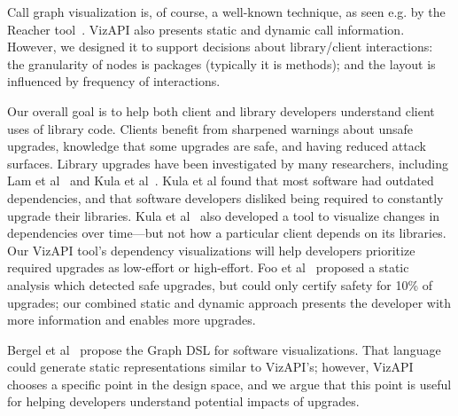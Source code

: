 Call graph visualization is, of course, a well-known technique, as seen e.g. by the Reacher tool~\cite{latoza11:_visual_call_graph}. 
VizAPI also presents static and dynamic call information. However, we designed
it to support decisions about library/client interactions: the granularity of nodes is packages (typically it is methods);
and the layout is influenced by frequency of interactions.

Our overall goal is to help both client and library developers understand
client uses of library code. Clients benefit from sharpened warnings
about unsafe upgrades, knowledge that some upgrades are safe, and
having reduced attack surfaces. Library upgrades have been
investigated by many researchers, including Lam et
al~\cite{lam20:_puttin_seman_seman_version} and Kula et al~\cite{kula18:_do_devel_updat_their_librar_depen}. Kula et al found that most
software had outdated dependencies, and that software developers disliked being required to constantly upgrade their
libraries. Kula et al~\cite{kula14:_visual_evolut_system_their_librar_depen} also developed a tool
to visualize changes in dependencies over time---but not how a particular client depends on its libraries. 
Our VizAPI tool's dependency visualizations will help developers
prioritize required upgrades as low-effort or high-effort.
Foo et al~\cite{foo18:_effic_static_check_librar_updat}
proposed a static analysis which detected safe upgrades, but could
only certify safety for 10\% of upgrades; our combined static and
dynamic approach presents the developer with more information and
enables more upgrades. 

Bergel et al~\cite{bergel14:_domain_specif_languag_visual_softw_depen_graph} propose the {\sc Graph} DSL
for software visualizations. That language could generate static representations similar to VizAPI's; however,
VizAPI chooses a specific point in the design space, and we argue that this point is useful for helping developers understand
potential impacts of upgrades.
